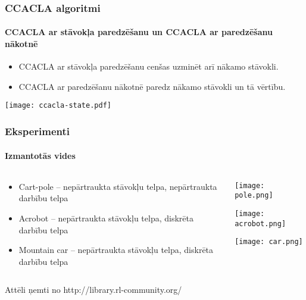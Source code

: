 \documentclass[xetex,mathserif]{beamer}
\begin{document}
  \begin{frame}
    \frametitle{CCACLA algoritmi}
    \framesubtitle{CCACLA ar stāvokļa paredzēšanu un CCACLA ar paredzēšanu nākotnē}
    \begin{itemize}
      \item CCACLA ar stāvokļa paredzēšanu cenšas uzminēt arī nākamo stāvokli.
      \item CCACLA ar paredzēšanu nākotnē paredz nākamo stāvokli un tā vērtību.
    \end{itemize}
    \begin{center}
      \hspace{2cm} \texttt{[image: ccacla-state.pdf]}
    \end{center}
  \end{frame}
  
  \begin{frame}
    \frametitle{Eksperimenti}
    \framesubtitle{Izmantotās vides}
    \begin{columns}[c]
    \begin{column}[c]{5cm}
      \begin{itemize}
        \item Cart-pole -- nepārtraukta stāvokļu telpa, nepārtraukta darbību telpa
        \item Acrobot -- nepārtraukta stāvokļu telpa, diskrēta darbību telpa
        \item Mountain car -- nepārtraukta stāvokļu telpa, diskrēta darbību telpa
      \end{itemize}

    \end{column}
    \begin{column}[c]{5cm}
      \texttt{[image: pole.png]}

      \vspace{1cm}
      \texttt{[image: acrobot.png]}

      \vspace{0.7cm}
      \texttt{[image: car.png]}
    \end{column}
    \end{columns}
      \tiny{Attēli ņemti no http://library.rl-community.org/}
  \end{frame}
\end{document}
